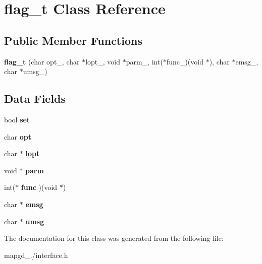 \hypertarget{classflag__t}{\section{flag\-\_\-t Class Reference}
\label{classflag__t}
}
\subsection*{Public Member Functions}
\begin{DoxyCompactItemize}
\item 
\hypertarget{classflag__t_a0fb866dc289c51d3cf31f8d2cc60c428}{{\bfseries flag\-\_\-t} (char opt\-\_\-, char $\ast$lopt\-\_\-, void $\ast$parm\-\_\-, int($\ast$func\-\_\-)(void $\ast$), char $\ast$emsg\-\_\-, char $\ast$umsg\-\_\-)}\label{classflag__t_a0fb866dc289c51d3cf31f8d2cc60c428}

\end{DoxyCompactItemize}
\subsection*{Data Fields}
\begin{DoxyCompactItemize}
\item 
\hypertarget{classflag__t_ad67f340df82fffbea1eef157ea00b6aa}{bool {\bfseries set}}\label{classflag__t_ad67f340df82fffbea1eef157ea00b6aa}

\item 
\hypertarget{classflag__t_abc7a5e5c09a1663833b54aea8df934d4}{char {\bfseries opt}}\label{classflag__t_abc7a5e5c09a1663833b54aea8df934d4}

\item 
\hypertarget{classflag__t_a28ca5f17d5c1765288359b060e1ef0f6}{char $\ast$ {\bfseries lopt}}\label{classflag__t_a28ca5f17d5c1765288359b060e1ef0f6}

\item 
\hypertarget{classflag__t_a5c61b009bf1d18cef797fd54291136fb}{void $\ast$ {\bfseries parm}}\label{classflag__t_a5c61b009bf1d18cef797fd54291136fb}

\item 
\hypertarget{classflag__t_a0df7aa844332aebaf5ccb68d889cd584}{int($\ast$ {\bfseries func} )(void $\ast$)}\label{classflag__t_a0df7aa844332aebaf5ccb68d889cd584}

\item 
\hypertarget{classflag__t_ad1efcb645ef5b3c0bf958c11b3867cb1}{char $\ast$ {\bfseries emsg}}\label{classflag__t_ad1efcb645ef5b3c0bf958c11b3867cb1}

\item 
\hypertarget{classflag__t_a046af852179fa30fef1536f38d65aa77}{char $\ast$ {\bfseries umsg}}\label{classflag__t_a046af852179fa30fef1536f38d65aa77}

\end{DoxyCompactItemize}


The documentation for this class was generated from the following file\-:\begin{DoxyCompactItemize}
\item 
mapgd\-\_./interface.\-h\end{DoxyCompactItemize}
